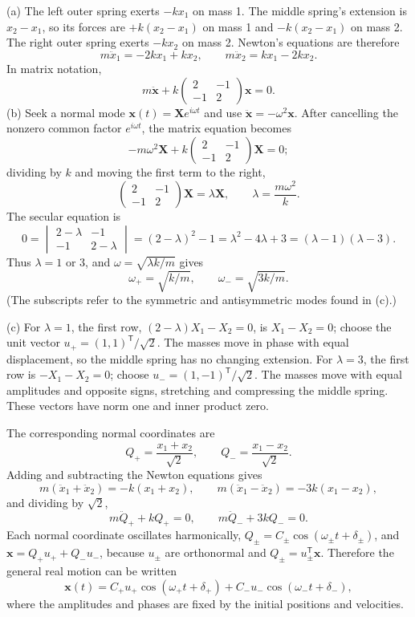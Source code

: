 (a) The left outer spring exerts $-kx_1$ on mass 1. The middle spring's
extension is $x_2-x_1$, so its forces are $+k(x_2-x_1)$ on mass 1 and
$-k(x_2-x_1)$ on mass 2. The right outer spring exerts $-kx_2$ on
mass 2. Newton's equations are therefore
\[
\boxed{m\ddot x_1=-2kx_1+kx_2,\qquad
       m\ddot x_2=kx_1-2kx_2.}
\]
In matrix notation,
\[
m\ddot{\boldsymbol x}+k
\begin{pmatrix}2&-1\\-1&2\end{pmatrix}\boldsymbol x=0.
\]
(b) Seek a normal mode
$\boldsymbol x(t)=\boldsymbol X e^{i\omega t}$ and use
$\ddot{\boldsymbol x}=-\omega^2\boldsymbol x$. After cancelling the
nonzero common factor $e^{i\omega t}$, the matrix equation becomes
\[
-m\omega^2\boldsymbol X+k\begin{pmatrix}2&-1\\-1&2\end{pmatrix}
\boldsymbol X=0;
\]
dividing by $k$ and moving the first term to the right,
\[
\begin{pmatrix}2&-1\\-1&2\end{pmatrix}\boldsymbol X
=\lambda\boldsymbol X,
\qquad\lambda=\frac{m\omega^2}{k}.
\]
The secular equation is
\[
0=\begin{vmatrix}2-\lambda&-1\\-1&2-\lambda\end{vmatrix}
=(2-\lambda)^2-1
=\lambda^2-4\lambda+3=(\lambda-1)(\lambda-3).
\]
Thus $\lambda=1$ or $3$, and $\omega=\sqrt{\lambda k/m}$ gives
\[
\boxed{\omega_+=\sqrt{k/m},\qquad\omega_-=\sqrt{3k/m}.}
\]
(The subscripts refer to the symmetric and antisymmetric modes found in
(c).)

(c) For $\lambda=1$, the first row, $(2-\lambda)X_1-X_2=0$, is
$X_1-X_2=0$; choose the unit vector $u_+=(1,1)^{\mathsf T}/\sqrt2$.
The masses move in phase with equal displacement, so the middle spring
has no changing extension.
For $\lambda=3$, the first row is $-X_1-X_2=0$; choose
$u_-=(1,-1)^{\mathsf T}/\sqrt2$. The masses move with equal amplitudes
and opposite signs, stretching and compressing the middle spring.
These vectors have norm one and inner product zero.

The corresponding normal coordinates are
\[
Q_+=\frac{x_1+x_2}{\sqrt2},\qquad Q_-=\frac{x_1-x_2}{\sqrt2}.
\]
Adding and subtracting the Newton equations gives
\[
m(\ddot x_1+\ddot x_2)=-k(x_1+x_2),\qquad
m(\ddot x_1-\ddot x_2)=-3k(x_1-x_2),
\]
and dividing by $\sqrt2$,
\[
m\ddot Q_++kQ_+=0,\qquad m\ddot Q_-+3kQ_-=0.
\]
Each normal coordinate oscillates harmonically,
$Q_\pm=C_\pm\cos(\omega_\pm t+\delta_\pm)$, and
$\boldsymbol x=Q_+u_++Q_-u_-$, because $u_\pm$ are orthonormal and
$Q_\pm=u_\pm^{\mathsf T}\boldsymbol x$.
Therefore the general real motion can be written
\[
\boxed{\boldsymbol x(t)
=C_+u_+\cos(\omega_+t+\delta_+)
 +C_-u_-\cos(\omega_-t+\delta_-),}
\]
where the amplitudes and phases are fixed by the initial positions
and velocities.

